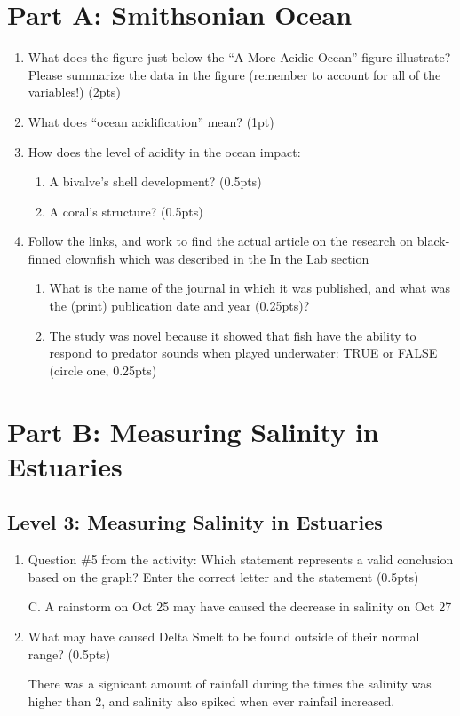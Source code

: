 \documentclass[12pt,letterpaper]{article}
\begin{document}
\section*{Part A: Smithsonian Ocean}
\begin{enumerate}[font=\bfseries, wide]
    \item What does the figure just below the  “A More Acidic Ocean” figure illustrate? Please summarize the data in the figure (remember to account for all of the variables!) (2pts)
    \item What does “ocean acidification” mean? (1pt)
    \item How does the level of acidity in the ocean impact:
    \begin{enumerate}
        \item  A bivalve’s shell development? (0.5pts)
        \item  A coral’s structure? (0.5pts)
    \end{enumerate}
    \item Follow the links, and work to find the actual article on the research on black-finned clownfish which was described in the In the Lab section
    \begin{enumerate}
        \item What is the name of the journal in which it was published, and what was the (print) publication date and year (0.25pts)?
        \item The study was novel because it showed that fish have the ability to respond to predator sounds when played underwater:  TRUE or FALSE (circle one, 0.25pts)
    \end{enumerate}
\end{enumerate}

\section*{Part B: Measuring Salinity in Estuaries}
\subsection*{Level 3: Measuring Salinity in Estuaries}
\begin{enumerate}[font=\bfseries, wide, resume]
    \item Question \#5 from the activity: Which statement represents a valid conclusion based on the graph?  Enter the correct letter and the statement (0.5pts)\par

    C. A rainstorm on Oct 25 may have caused the decrease in salinity on Oct 27

    \item What may have caused Delta Smelt to be found outside of their normal range? (0.5pts)\par 

    There was a signicant amount of rainfall during the times the salinity was higher than 2, and salinity also spiked when ever rainfail increased. 
\end{enumerate}
\end{document}
